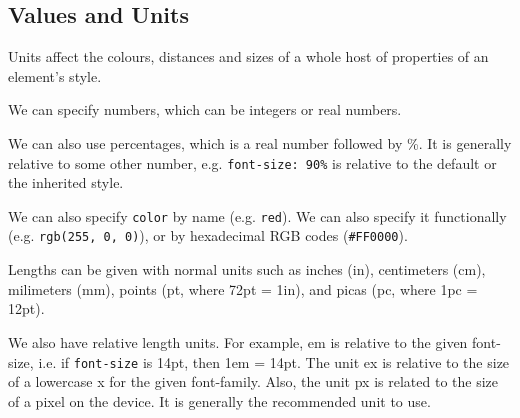 \documentclass[a4paper, openany]{memoir}
\begin{document}
\subsection{Values and Units}
Units affect the colours, distances and sizes of a whole host of properties of an element's style. 

\noindent We can specify numbers, which can be integers or real numbers. 

\noindent We can also use percentages, which is a real number followed by \%. It is generally relative to some other number, e.g. \texttt{font-size: 90\%} is relative to the default or the inherited style. 

\noindent We can also specify \texttt{color} by name (e.g. \texttt{red}). We can also specify it functionally (e.g. \texttt{rgb(255, 0, 0)}), or by hexadecimal RGB codes (\texttt{\#FF0000}).

\noindent Lengths can be given with normal units such as inches (in), centimeters (cm), milimeters (mm), points (pt, where 72pt = 1in), and picas (pc, where 1pc = 12pt).

\noindent We also have relative length units. For example, em is relative to the given font-size, i.e. if \texttt{font-size} is 14pt, then 1em = 14pt. The unit ex is relative to the size of a lowercase x for the given font-family. Also, the unit px is related to the size of a pixel on the device. It is generally the recommended unit to use.
\end{document}
